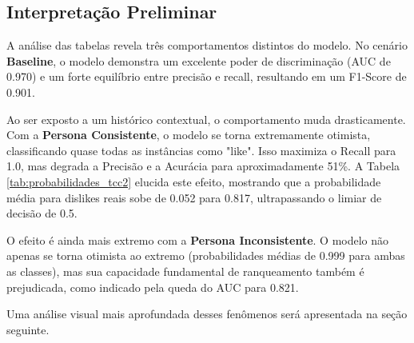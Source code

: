 \subsection*{Interpretação Preliminar}
A análise das tabelas revela três comportamentos distintos do modelo. No cenário \textbf{Baseline}, o modelo demonstra um excelente poder de discriminação (AUC de 0.970) e um forte equilíbrio entre precisão e recall, resultando em um F1-Score de 0.901.

Ao ser exposto a um histórico contextual, o comportamento muda drasticamente. Com a \textbf{Persona Consistente}, o modelo se torna extremamente otimista, classificando quase todas as instâncias como "like". Isso maximiza o Recall para 1.0, mas degrada a Precisão e a Acurácia para aproximadamente 51\%. A Tabela \ref{tab:probabilidades_tcc2} elucida este efeito, mostrando que a probabilidade média para dislikes reais sobe de 0.052 para 0.817, ultrapassando o limiar de decisão de 0.5.

O efeito é ainda mais extremo com a \textbf{Persona Inconsistente}. O modelo não apenas se torna otimista ao extremo (probabilidades médias de 0.999 para ambas as classes), mas sua capacidade fundamental de ranqueamento também é prejudicada, como indicado pela queda do AUC para 0.821.

Uma análise visual mais aprofundada desses fenômenos será apresentada na seção seguinte.
